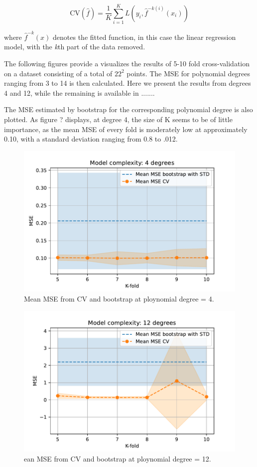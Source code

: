 \documentclass[11pt, a4paper]{article}
\begin{document}
\[
  \text{CV}(\hat{f}) = \frac{1}{K}
  \sum_{i=1}^{K}L(y_i,\hat{f}^{-k(i)}(x_i))
\]

where $\hat{f}^{-k}(x)$ denotes the fitted function, in this case the linear regression model, with the \emph{k}th part of the data removed.\cite{Hastie2009}

The following figures provide a visualizes the results of 5-10 fold cross-validation on a dataset consisting of a total of $22^2$ points\cite{notebook_exc3}. The MSE for polynomial degrees ranging from 3 to 14 is then calculated. Here we present the results from degrees 4 and 12, while the remaining is available in {.......}


The MSE estimated by bootstrap for the corresponding polynomial degree is also plotted. As figure ? displays,  at degree 4, the size of K seems to be of little importance, as the mean MSE of every fold is moderately low at approximately 0.10, with a standard deviation ranging from 0.8 to .012.

\begin{figure}[h]
  \centering
  \includegraphics[scale=0.75]{figures/EX3_mse_cv_boot4.pdf}
  \caption{\label{fig:?} Mean MSE from CV and bootstrap at ploynomial degree = 4.}
\end{figure}



\begin{figure}[h]
  \centering
  \includegraphics[scale=0.75]{figures/EX3_mse_cv_boot12.pdf}
  \caption{\label{fig:?}ean MSE from CV and bootstrap at ploynomial degree = 12.}
\end{figure}
\end{document}
